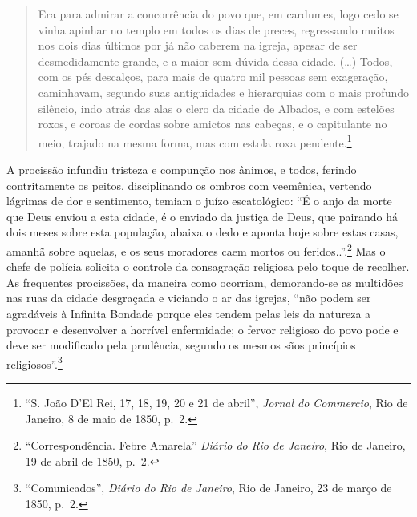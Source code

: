 \begin{quote}
Era para admirar a concorrência do povo que, em cardumes, logo cedo se
vinha apinhar no templo em todos os dias de preces, regressando muitos
nos dois dias últimos por já não caberem na igreja, apesar de ser
desmedidamente grande, e a maior sem dúvida dessa cidade. (\dots{}) Todos,
com os pés descalços, para mais de quatro mil pessoas sem exageração,
caminhavam, segundo suas antiguidades e hierarquias com o mais profundo
silêncio, indo atrás das alas o clero da cidade de Albados, e com
estelões roxos, e coroas de cordas sobre amictos nas cabeças, e o
capitulante no meio, trajado na mesma forma, mas com estola roxa
pendente.\footnote{``S. João D'El Rei, 17, 18, 19, 20 e 21 de abril'',
  \textit{Jornal do Commercio}, Rio de Janeiro, 8 de maio de 1850, p.~2.}
\end{quote}

A procissão infundiu tristeza e compunção nos ânimos, e todos, ferindo
contritamente os peitos, disciplinando os ombros com veemênica, vertendo
lágrimas de dor e sentimento, temiam o juízo escatológico: ``É o anjo da
morte que Deus enviou a esta cidade, é o enviado da justiça de Deus, que
pairando há dois meses sobre esta população, abaixa o dedo e aponta hoje
sobre estas casas, amanhã sobre aquelas, e os seus moradores caem mortos
ou feridos..''.\footnote{``Correspondência. Febre Amarela'' \textit{Diário
  do Rio de Janeiro}, Rio de Janeiro, 19 de abril de 1850, p.~2.} Mas o
chefe de polícia solicita o controle da consagração religiosa pelo toque
de recolher. As frequentes procissões, da maneira como ocorriam,
demorando-se as multidões nas ruas da cidade desgraçada e viciando o ar
das igrejas, ``não podem ser agradáveis à Infinita Bondade porque eles
tendem pelas leis da natureza a provocar e desenvolver a horrível
enfermidade; o fervor religioso do povo pode e deve ser modificado pela
prudência, segundo os mesmos sãos princípios religiosos''.\footnote{``Comunicados'',
  \textit{Diário do Rio de Janeiro}, Rio de Janeiro, 23 de março de 1850,
  p.~2.}

